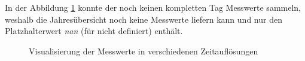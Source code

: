 In der Abbildung \ref{4times} konnte der  noch keinen kompletten Tag Messwerte sammeln, weshalb die Jahresübersicht noch keine Messwerte liefern kann und nur den Platzhalterwert \textit{nan} (für nicht definiert) enthält.

\begin{figure}[ht]
	\centering
		\caption{Visualisierung der Messwerte in verschiedenen Zeitauflösungen}
		\label{4times}
\end{figure}

